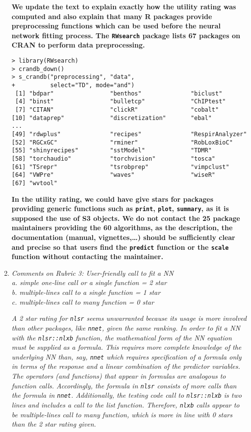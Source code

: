 \documentclass[12pt]{article}
\newcommand{\code}{\texttt}
\newcommand{\soft}{\textsf}
\begin{document}
\begin{enumerate}
\textbf{We update the text to explain exactly how the utility rating was computed and also explain
that many \soft{R} packages provide preprocessing functions which can be used before the neural network
fitting process.
The \code{RWsearch} package lists 67 packages on CRAN to perform data preprocessing.}
\begin{verbatim}
> library(RWsearch)
> crandb_down()
> s_crandb("preprocessing", "data",
+          select="TD", mode="and")
 [1] "bdpar"                "benthos"              "biclust"             
 [4] "binst"                "bulletcp"             "ChIPtest"            
 [7] "CITAN"                "clickR"               "cobalt"              
[10] "dataprep"             "discretization"       "ebal"                
...    
[49] "rdwplus"              "recipes"              "RespirAnalyzer"      
[52] "RGCxGC"               "rminer"               "RobLoxBioC"          
[55] "shinyrecipes"         "sstModel"             "TDMR"                
[58] "torchaudio"           "torchvision"          "tosca"               
[61] "TSrepr"               "tsrobprep"            "vimpclust"           
[64] "VWPre"                "waves"                "wiseR"               
[67] "wvtool"  
\end{verbatim}
\textbf{In the utility rating, we could have give stars for packages providing generic functions such as \code{print},
\code{plot}, \code{summary}, as it is supposed the use of S3 objects. 
We do not contact the 25 package maintainers providing the 60 algorithms, as the description, the documentation 
(manual, vignettes,\dots) should be sufficiently clear and precise so that users find the \code{predict} function
or the \code{scale} function without contacting the maintainer.
}

\item \textit{
Comments on Rubric 3: User-friendly call to fit a NN\\
       a. simple one-line call or a single function = 2 star\\
       b. multiple-lines call to a single function = 1 star\\
       c. multiple-lines call to many function = 0 star}

       
 \textit{A 2 star rating for \code{nlsr} seems unwarranted because its usage is more involved than other packages, like \code{nnet}, given the same ranking.  In order to fit a NN with the \code{nlsr::nlxb} function, the mathematical form of the NN equation must be supplied as a formula.  This requires more complete knowledge of the underlying NN than, say, \code{nnet} which requires specification of a formula only in terms of the response and a linear combination of the predictor variables.  The operators (and functions) that appear in formulas are analogous to function calls.  Accordingly, the formula in \code{nlsr} consists of more calls than the formula in \code{nnet}.  Additionally, the testing code call to \code{nlsr::nlxb} is two lines and includes a call to the list function.  Therefore, \code{nlxb} calls appear to be multiple-lines call to many function, which is more in line with 0 stars than the 2 star rating given.}


\end{enumerate}
\end{document}
